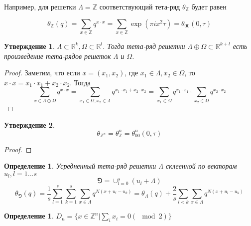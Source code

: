 \documentclass{article}
\newcommand{\ZZ}{\mathbb{Z}}
\newcommand{\RR}{\mathbb{R}}
\theoremstyle{break}
\newtheorem{definition}[theorem]{Определение}
\newtheorem{claim}{Утверждение}[section]
\begin{document}
Например, для решетки $\Lambda=\ZZ$ соответствующий тета-ряд $\theta_\ZZ$ будет равен

\begin{equation}
	\theta_{\ZZ}(q) = \sum_{x \in \ZZ} q^{x \cdot x} = 
	\sum_{x \in \ZZ} \exp(\pi i x^2 \tau) = \theta_{00}(0, \tau)
\end{equation}


\begin{claim}
	$\Lambda \subset \RR^k, \Omega \subset \RR^l$. Тогда тета-ряд решетки 
	$\Lambda \oplus \Omega \subset \RR^{k + l}$ есть произведение тета-рядов
	решеток $\Lambda$ и $\Omega$.
\end{claim}
\begin{proof}
	Заметим, что если $x = (x_1, x_2)$, где $x_1 \in \Lambda, x_2 \in \Omega$, то 
	$x \cdot x = x_1 \cdot x_1 + x_2 \cdot x_2$. Тогда 
	\begin{equation}
		\sum_{x \in \Lambda \oplus \Omega} q ^ {x \cdot x}
		= \sum_{x_1 \in \Omega, x_2 \in \Lambda} q ^ {x_1 \cdot x_1 + x_2 \cdot x_2}
		= \sum_{x_1 \in \Omega} q ^ {x_1 \cdot x_1} \cdot 
		\sum_{x_2 \in \Omega} q ^ {x_2 \cdot x_2}
	\end{equation}
\end{proof}

\begin{claim}
	\begin{equation}\theta_{\ZZ^n}=\theta_{\ZZ}^n = \theta_{00}^n(0, \tau)\end{equation}
\end{claim}
\begin{proof}
	
\end{proof}



\begin{definition}
	Усредненный тета-ряд решетки $\Lambda$ склеенной по векторам $u_l, l=1...s$
	\begin{equation}
		\Game = \cup_{l=0}^s (u_l + \Lambda)
	\end{equation}
	\begin{equation}
		\theta_{\Game}(q)=\frac{1}{s} \sum_{l=1}^s \sum_{k=1}^s 
			\sum_{x \in \Lambda} q^{N(x + u_l - u_k)}
		= \theta_{\Lambda}(q) + \frac{2}{s} \sum_{l < k} 
			\sum_{x \in \Lambda} q^{N(x + u_l - u_k)}
	\end{equation}
\end{definition}

\begin{definition}
	$D_n = \{x \in \ZZ^n | \sum_i x_i = 0 (\mod 2)\}$
\end{definition}
\end{document}
